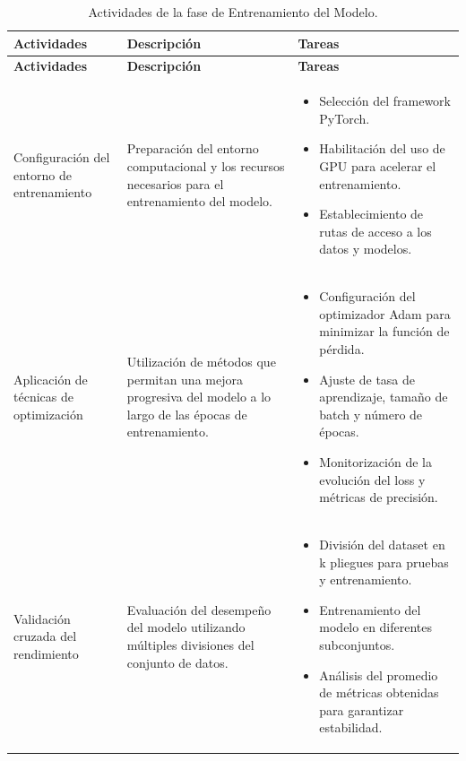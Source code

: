 \vspace{2ex}
 \begingroup
 \renewcommand\arraystretch{1.2}
 \begin{longtable}{p{4cm} p{6cm} p{6cm}}
 \caption{Actividades de la fase de Entrenamiento del Modelo.}
 \label{tabla:entrenamiento_modelo}\\
 \toprule
 \textbf{Actividades} & \textbf{Descripción} & \textbf{Tareas} \\
 \midrule
 \endfirsthead
 
 \toprule
 \textbf{Actividades} & \textbf{Descripción} & \textbf{Tareas} \\
 \midrule
 \endhead
 
 \bottomrule
 \endfoot
 
 Configuración del entorno de entrenamiento &
 Preparación del entorno computacional y los recursos necesarios para el entrenamiento del modelo. &
 \begin{itemize}
     \item Selección del framework PyTorch.
     \item Habilitación del uso de GPU para acelerar el entrenamiento.
     \item Establecimiento de rutas de acceso a los datos y modelos.
 \end{itemize} \\
 
 Aplicación de técnicas de optimización &
 Utilización de métodos que permitan una mejora progresiva del modelo a lo largo de las épocas de entrenamiento. &
 \begin{itemize}
     \item Configuración del optimizador Adam para minimizar la función de pérdida.
     \item Ajuste de tasa de aprendizaje, tamaño de batch y número de épocas.
     \item Monitorización de la evolución del loss y métricas de precisión.
 \end{itemize} \\
 
 Validación cruzada del rendimiento &
 Evaluación del desempeño del modelo utilizando múltiples divisiones del conjunto de datos. &
 \begin{itemize}
     \item División del dataset en k pliegues para pruebas y entrenamiento.
     \item Entrenamiento del modelo en diferentes subconjuntos.
     \item Análisis del promedio de métricas obtenidas para garantizar estabilidad.
 \end{itemize} \\
 
 \end{longtable}
 \endgroup

